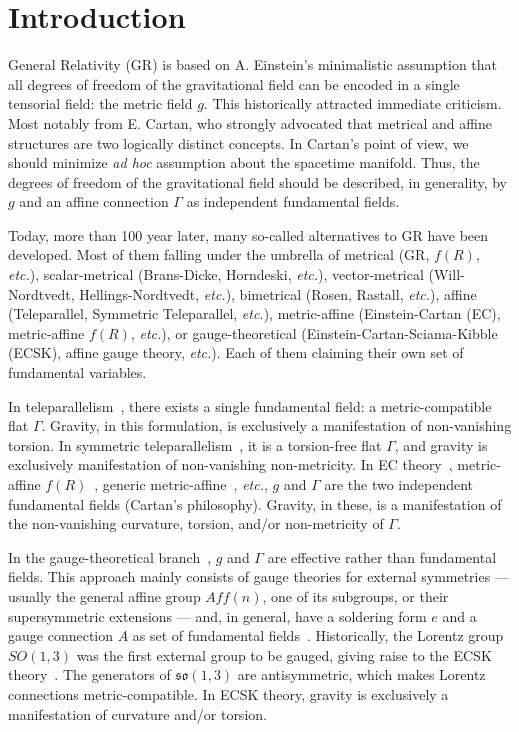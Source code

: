 \documentclass[../../main.tex]{subfiles}
\begin{document}
\section{Introduction}\label{sec:introduction}

General Relativity (GR) is based on A. Einstein's minimalistic assumption that all degrees of freedom of the gravitational field can be encoded in a single tensorial field: the metric field $g$. This historically attracted immediate criticism. Most notably from E. Cartan, who strongly advocated that metrical and affine structures are two logically distinct concepts. In Cartan's point of view, we should minimize \textit{ad hoc} assumption about the spacetime manifold. Thus, the degrees of freedom of the gravitational field should be described, in generality, by $g$ and an affine connection $\Gamma$ as independent fundamental fields.

Today, more than 100 year later, many so-called alternatives to GR have been developed. Most of them falling under the umbrella of metrical (GR, $f\left(R\right)$, \textit{etc.}), scalar-metrical (Brans-Dicke, Horndeski, \textit{etc.}), vector-metrical (Will-Nordtvedt, Hellings-Nordtvedt, \textit{etc.}), bimetrical (Rosen, Rastall, \textit{etc.}), affine (Teleparallel, Symmetric Teleparallel, \textit{etc.}), metric-affine (Einstein-Cartan (EC), metric-affine $f(R)$, \textit{etc.}), or gauge-theoretical (Einstein-Cartan-Sciama-Kibble (ECSK), affine gauge theory, \textit{etc.}). Each of them claiming their own set of fundamental variables.

In teleparallelism~\cite{aldrovandi2013,maluf2013}, there exists a single fundamental field: a metric-compatible flat $\Gamma$. Gravity, in this formulation, is exclusively a manifestation of non-vanishing torsion. In symmetric teleparallelism~\cite{ferraris1982a,nester1999}, it is a torsion-free flat $\Gamma$, and gravity is exclusively manifestation of non-vanishing non-metricity. In EC theory~\cite{hehl1974,hehl1976a,trautman2006}, metric-affine $f(R)$~\cite{sotiriou2007,sotiriou2009,sotiriou2010,olmo2011}, generic metric-affine~\cite{hehl1976b}, \textit{etc.}, $g$ and $\Gamma$ are the two independent fundamental fields (Cartan's philosophy). Gravity, in these, is a manifestation of the non-vanishing curvature, torsion, and/or non-metricity of $\Gamma$.

In the gauge-theoretical branch~\cite{ivanenko1983a,sardanashvily2016a,hehl1995,gronwald1995,gronwald1997,sardanashvily2002a,hehl2012}, $g$ and $\Gamma$ are effective rather than fundamental fields. This approach mainly consists of gauge theories for external symmetries --- usually the general affine group $Aff\left(n\right)$, one of its subgroups, or their supersymmetric extensions --- and, in general, have a soldering form $e$ and a gauge connection $A$ as set of fundamental fields~\cite{hehl1995}. Historically, the Lorentz group $SO\left(1,3\right)$ was the first external group to be gauged, giving raise to the ECSK theory~\cite{utiyama1956,kibble1961,sciama1962,sciama1964}. The generators of $\mathfrak{so}\left(1,3\right)$ are antisymmetric, which makes Lorentz connections metric-compatible. In ECSK theory, gravity is exclusively a manifestation of curvature and/or torsion.
\end{document}
